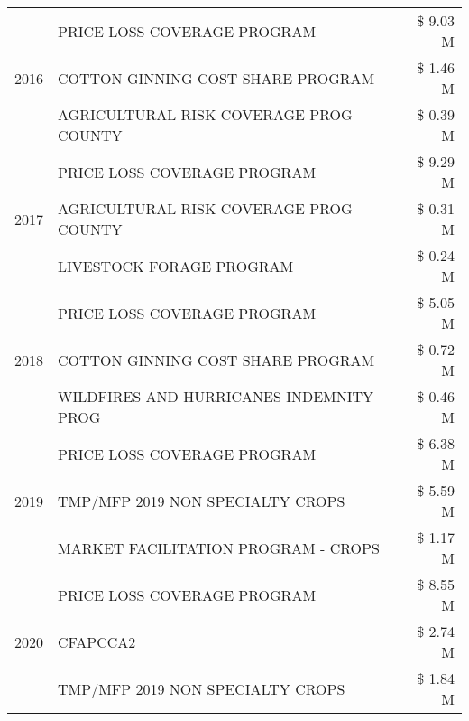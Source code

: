 \begin{tabular}{llr}
\cline{1-3}
\multirow[t]{3}{*}{2016} & PRICE LOSS COVERAGE PROGRAM                   & \$ 9.03 M \\
 & COTTON GINNING COST SHARE PROGRAM             & \$ 1.46 M \\
 & AGRICULTURAL RISK COVERAGE PROG - COUNTY      & \$ 0.39 M \\
\cline{1-3}
\multirow[t]{3}{*}{2017} & PRICE LOSS COVERAGE PROGRAM & \$ 9.29 M \\
 & AGRICULTURAL RISK COVERAGE PROG - COUNTY & \$ 0.31 M \\
 & LIVESTOCK FORAGE PROGRAM & \$ 0.24 M \\
\cline{1-3}
\multirow[t]{3}{*}{2018} & PRICE LOSS COVERAGE PROGRAM & \$ 5.05 M \\
 & COTTON GINNING COST SHARE PROGRAM & \$ 0.72 M \\
 & WILDFIRES AND HURRICANES INDEMNITY PROG & \$ 0.46 M \\
\cline{1-3}
\multirow[t]{3}{*}{2019} & PRICE LOSS COVERAGE PROGRAM & \$ 6.38 M \\
 & TMP/MFP 2019 NON SPECIALTY CROPS & \$ 5.59 M \\
 & MARKET FACILITATION PROGRAM - CROPS & \$ 1.17 M \\
\cline{1-3}
\multirow[t]{3}{*}{2020} & PRICE LOSS COVERAGE PROGRAM & \$ 8.55 M \\
 & CFAPCCA2 & \$ 2.74 M \\
 & TMP/MFP 2019 NON SPECIALTY CROPS & \$ 1.84 M \\
\cline{1-3}
\bottomrule
\end{tabular}
